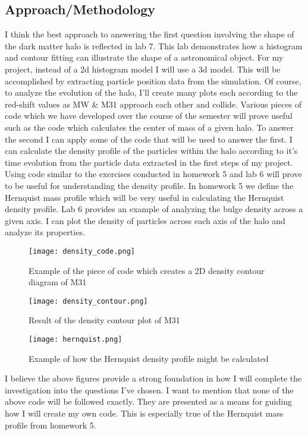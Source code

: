 \documentclass[fleqn,usenatbib]{mnras}
\begin{document}
\subsection{Approach/Methodology}
I think the best approach to answering the first question involving the shape of the dark matter halo is reflected in lab 7. This lab demonstrates how a histogram and contour fitting can illustrate the shape of a astronomical object. For my project, instead of a 2d histogram model I will use a 3d model. This will be accomplished by extracting particle position data from the simulation. Of course, to analyze the evolution of the halo, I'll create many plots each according to the red-shift values as MW \& M31 approach each other and collide. Various pieces of code which we have developed over the course of the semester will prove useful such as the code which calculates the center of mass of a given halo. To answer the second I can apply some of the code that will be used to answer the first. I can calculate the density profile of the particles within the halo according to it's time evolution from the particle data extracted in the first steps of my project. Using code similar to the exercises conducted in homework 5 and lab 6 will prove to be useful for understanding the density profile. In homework 5 we define the Hernquist mass profile which will be very useful in calculating the Hernquist density profile. Lab 6 provides an example of analyzing the bulge density across a given axis. I can plot the density of particles across each axis of the halo and analyze its properties. 
\begin{figure}
	\texttt{[image: density\_code.png]}
    \caption{Example of the piece of code which creates a 2D density contour diagram of M31}
    \label{fig:density_code}
\end{figure}
\begin{figure}
	\texttt{[image: density\_contour.png]}
    \caption{Result of the density contour plot of M31}
    \label{fig:density_figure}
\end{figure}
\begin{figure}
	\texttt{[image: hernquist.png]}
    \caption{Example of how the Hernquist density profile might be calculated}
    \label{fig:Hernquist}
\end{figure}
I believe the above figures provide a strong foundation in how I will complete the investigation into the questions I've chosen. I want to mention that none of the above code will be followed exactly. They are presented as a means for guiding how I will create my own code. This is especially true of the Hernquist mass profile from homework 5. 
\end{document}
